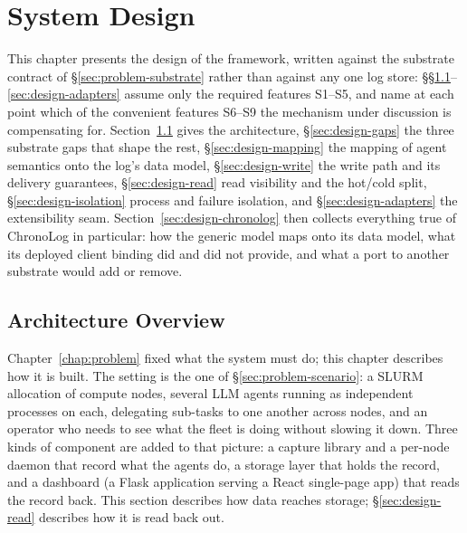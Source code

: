 \chapter{System Design}
\label{chap:design}

This chapter presents the design of the framework, written against the substrate
contract of \S\ref{sec:problem-substrate} rather than against any one log
store: \S\S\ref{sec:design-overview}--\ref{sec:design-adapters} assume only
the required features S1--S5, and name at each point which of the convenient
features S6--S9 the mechanism under discussion is compensating for.
Section~\ref{sec:design-overview} gives the architecture,
\S\ref{sec:design-gaps} the three substrate gaps that shape the rest,
\S\ref{sec:design-mapping} the mapping of agent semantics onto the log's
data model, \S\ref{sec:design-write} the write path and its delivery
guarantees, \S\ref{sec:design-read} read visibility and the hot/cold split,
\S\ref{sec:design-isolation} process and failure isolation, and
\S\ref{sec:design-adapters} the extensibility seam.
Section~\ref{sec:design-chronolog} then collects everything true of
ChronoLog in particular: how the generic model maps onto its data model,
what its deployed client binding did and did not provide, and what a port to
another substrate would add or remove.

\section{Architecture Overview}
\label{sec:design-overview}

Chapter~\ref{chap:problem} fixed what the system must do; this chapter
describes how it is built. The setting is the one of
\S\ref{sec:problem-scenario}: a SLURM allocation of compute nodes, several
LLM agents running as independent processes on each, delegating sub-tasks to
one another across nodes, and an operator who needs to see what the fleet is
doing without slowing it down. Three kinds of component are added to that
picture: a capture library and a per-node daemon that record what the agents
do, a storage layer that holds the record, and a dashboard (a Flask
application serving a React single-page app) that reads the record back.
This section describes how data reaches storage;
\S\ref{sec:design-read} describes how it is read back out.

